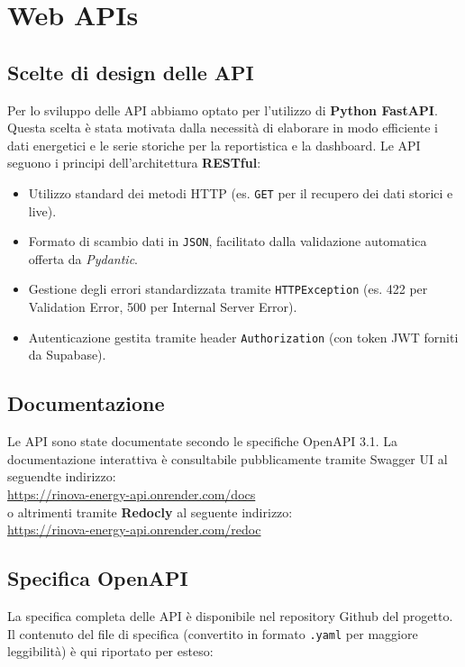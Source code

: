 \setcounter{section}{1}
\setlength{\parindent}{0pt}  %
\setlength{\parskip}{6pt}  
\section{Web APIs}
\subsection{Scelte di design delle API}
Per lo sviluppo delle API abbiamo optato per l'utilizzo di \textbf{Python FastAPI}. Questa scelta è stata motivata dalla necessità di elaborare in modo efficiente i dati energetici e le serie storiche per la reportistica e la dashboard. Le API seguono i principi dell'architettura \textbf{RESTful}:
\begin{itemize}
    \item Utilizzo standard dei metodi HTTP (es. \texttt{GET} per il recupero dei dati storici e live).
    \item Formato di scambio dati in \texttt{JSON}, facilitato dalla validazione automatica offerta da \textit{Pydantic}.
    \item Gestione degli errori standardizzata tramite \texttt{HTTPException} (es. 422 per Validation Error, 500 per Internal Server Error).
    \item Autenticazione gestita tramite header \texttt{Authorization} (con token JWT forniti da Supabase).
\end{itemize}

\subsection{Documentazione}
Le API sono state documentate secondo le specifiche OpenAPI 3.1. La documentazione interattiva è consultabile pubblicamente tramite Swagger UI al seguendte indirizzo: \\
\url{https://rinova-energy-api.onrender.com/docs} \\
o altrimenti tramite \textbf{Redocly} al seguente indirizzo: \\
\url{https://rinova-energy-api.onrender.com/redoc}

\subsection{Specifica OpenAPI}
La specifica completa delle API è disponibile nel repository Github del progetto. Il contenuto del file di specifica (convertito in formato \texttt{.yaml} per maggiore leggibilità) è qui riportato per esteso:

